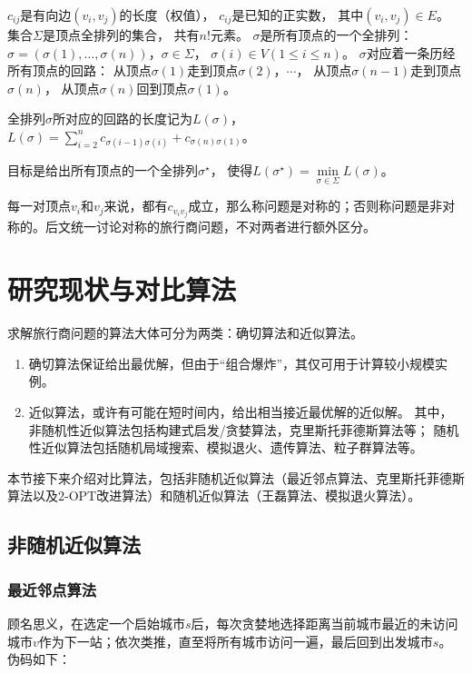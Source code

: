 \documentclass[12pt]{ctexart}
\begin{document}
$c_{ij}$是有向边$(v_i,v_j)$的长度（权值），
$c_{ij}$是已知的正实数，
其中$(v_i,v_j)\in E$。
集合$\Sigma$是顶点全排列的集合，
共有$n$!元素。
$\sigma$是所有顶点的一个全排列：$\sigma=(\sigma(1),\dots,\sigma(n))$，$\sigma \in \Sigma$，
$\sigma(i)\in V (1\le i \le n)$。
$\sigma$对应着一条历经所有顶点的回路：
从顶点$\sigma(1)$走到顶点$\sigma(2)$，$\cdots$，
从顶点$\sigma(n-1)$走到顶点$\sigma(n)$，
从顶点$\sigma(n)$回到顶点$\sigma(1)$。

全排列$\sigma$所对应的回路的长度记为$L(\sigma)$，
$L(\sigma) = \sum\limits_{{i=2}}^{n} c_{\sigma(i-1) \sigma(i)} + c_{\sigma(n) \sigma(1)}$。

目标是给出所有顶点的一个全排列$\sigma^\star$，
使得$L(\sigma^\star)= \mathop{\min}\limits_{{\sigma \in \Sigma}} L(\sigma)$。

每一对顶点$v_i$和$v_j$来说，都有$c_{v_i v_j}$成立，那么称问题是对称的；否则称问题是非对称的。后文统一讨论对称的旅行商问题，不对两者进行额外区分。

\section{研究现状与对比算法}

求解旅行商问题的算法大体可分为两类：确切算法和近似算法。
\begin{enumerate}
    \item 确切算法保证给出最优解，但由于“组合爆炸”，其仅可用于计算较小规模实例。
    \item 近似算法，或许有可能在短时间内，给出相当接近最优解的近似解。
          其中，非随机性近似算法包括构建式启发/贪婪算法，克里斯托菲德斯算法等；
          随机性近似算法包括随机局域搜索、模拟退火、遗传算法、粒子群算法等。
\end{enumerate}

本节接下来介绍对比算法，包括非随机近似算法（最近邻点算法、克里斯托菲德斯算法以及2-OPT改进算法）和随机近似算法（王磊算法、模拟退火算法）。

\subsection{非随机近似算法}
\subsubsection{最近邻点算法}

顾名思义，在选定一个启始城市$s$后，每次贪婪地选择距离当前城市最近的未访问城市$v$作为下一站；依次类推，直至将所有城市访问一遍，最后回到出发城市$s$。
伪码如下：
\end{document}
